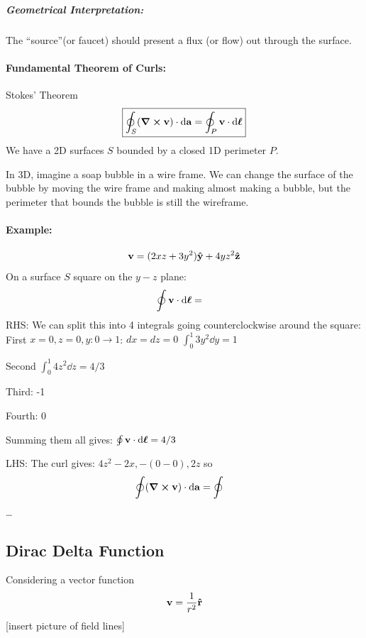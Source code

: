 \documentclass[../main.tex]{subfiles}
\begin{document}
\subparagraph*{Geometrical Interpretation:} 

The ``source''(or faucet) should present a flux (or flow) out through the surface.

\paragraph*{Fundamental Theorem of Curls:} Stokes' Theorem
\begin{align*}
    \boxed{
        \oint_S (\curl \vb v) \cdot \dd{\vb a} = \oint_P \vb v \cdot \dd{\vb*\ell}
    }
\end{align*}
We have a 2D surfaces $S$ bounded by a closed 1D perimeter $P$.

In 3D, imagine a soap bubble in a wire frame. We can change the surface of the bubble by moving the wire frame and making almost making a bubble, but the perimeter that bounds the bubble is still the wireframe.

\paragraph*{Example:}
\begin{align*}
    \vb v = (2xz + 3y^2)\vu y + 4yz^2 \vu z
\end{align*}
On a surface $S$ square on the $y-z$ plane:
\begin{align*}
    \oint \vb v \cdot \dd{\vb*\ell} &= 
\end{align*}
RHS: We can split this into 4 integrals going counterclockwise around the square:
First
$ x = 0, z = 0, y: 0 \to 1$: $dx = dz = 0$
$\int_0^1 3y^2 \dd y = 1$

Second
$\int_0^1 4z^2 \dd z = 4/3$

Third: -1

Fourth: 0

Summing them all gives: $\oint \vb v \cdot \dd{\vb*\ell} = 4/3$

LHS:
The curl gives: $4z^2-2x, -(0-0), 2z$ so
\begin{align*}
    \oint(\curl \vb v) \cdot \vb{\dd \vb a} &= \oint 
\end{align*}
\dots

\subsection{Dirac Delta Function}
Considering a vector function
\begin{align*}
    \vb v = \frac{1}{r^2} \vu r
\end{align*}
[insert picture of field lines]
\end{document}
